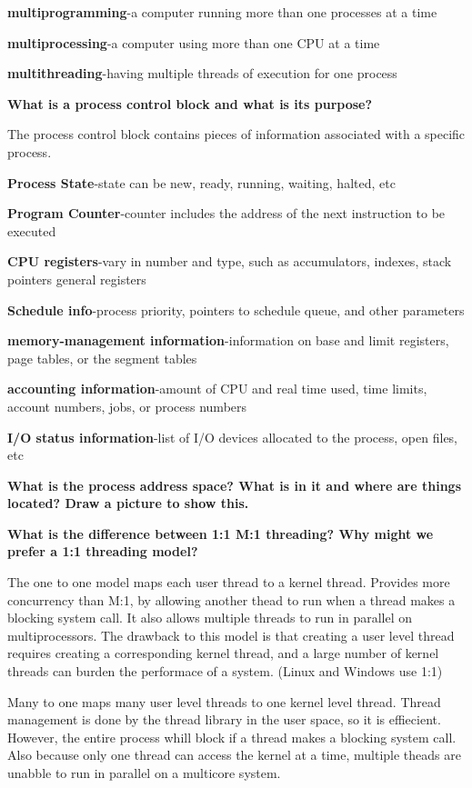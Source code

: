 \documentclass[8pt,landscape]{article}
\begin{document}
\begin{multicols}{3}
\begin{tiny}
\textbf{multiprogramming}-a computer running more than one processes at a time

\textbf{multiprocessing}-a computer using more than one CPU at a time

\textbf{multithreading}-having multiple threads of execution for one process

\textbf{What is a process control block and what is its purpose?}

The process control block contains pieces of information associated with a specific process.

\textbf{Process State}-state can be new, ready, running, waiting, halted, etc

\textbf{Program Counter}-counter includes the address of the next instruction to be executed

\textbf{CPU registers}-vary in number and type, such as accumulators, indexes, stack pointers
general registers

\textbf{Schedule info}-process priority, pointers to schedule queue, and other parameters

\textbf{memory-management information}-information on base and limit registers, page tables,
or the segment tables

\textbf{accounting information}-amount of CPU and real time used, time limits, account numbers,
jobs, or process numbers

\textbf{I/O status information}-list of I/O devices allocated to the process, open files, etc

\textbf{What is the process address space? What is in it and where are things located?
Draw a picture to show this.} 

\textbf{What is the difference between 1:1 M:1 threading? Why might we prefer a 1:1 threading 
model?}

The one to one model maps each user thread to a kernel thread. Provides more concurrency than M:1,
by allowing another thead to run when a thread makes a blocking system call. It also allows 
multiple threads to run in parallel on multiprocessors. The drawback to this model is that creating
a user level thread requires creating a corresponding kernel thread, and a large number of kernel 
threads can burden the performace of a system. (Linux and Windows use 1:1)

Many to one maps many user level threads to one kernel level thread. Thread management is done by
the thread library in the user space, so it is effiecient. However, the entire process whill block
if a thread makes a blocking system call. Also because only one thread can access the kernel at a
time, multiple theads are unabble to run in parallel on a multicore system.


\end{tiny}
\end{multicols}
\end{document}

